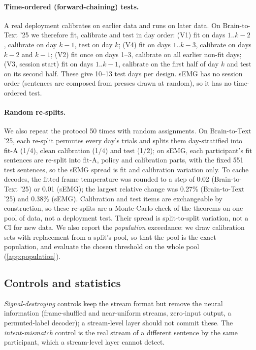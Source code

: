 \paragraph{Time-ordered (forward-chaining) tests.} A real deployment calibrates on earlier data and runs on later data. On Brain-to-Text '25 we therefore fit, calibrate and test in day order: (V1) fit on days $1..k{-}2$, calibrate on day $k{-}1$, test on day $k$; (V4) fit on days $1..k{-}3$, calibrate on days $k{-}2$ and $k{-}1$; (V2) fit once on days 1--3, calibrate on all earlier non-fit days; (V3, session start) fit on days $1..k{-}1$, calibrate on the first half of day $k$ and test on its second half. These give 10--13 test days per design. sEMG has no session order (sentences are composed from presses drawn at random), so it has no time-ordered test.

\paragraph{Random re-splits.} We also repeat the protocol 50 times with random assignments. On Brain-to-Text '25, each re-split permutes every day's trials and splits them day-stratified into fit-A (1/4), clean calibration (1/4) and test (1/2); on sEMG, each participant's fit sentences are re-split into fit-A, policy and calibration parts, with the fixed 551 test sentences, so the sEMG spread is fit and calibration variation only. To cache decodes, the fitted frame temperature was rounded to a step of 0.02 (Brain-to-Text '25) or 0.01 (sEMG); the largest relative change was 0.27\% (Brain-to-Text '25) and 0.38\% (sEMG). Calibration and test items are exchangeable by construction, so these re-splits are a Monte-Carlo check of the theorems on one pool of data, not a deployment test. Their spread is split-to-split variation, not a CI for new data. We also report the \emph{population} exceedance: we draw calibration sets with replacement from a split's pool, so that the pool is the exact population, and evaluate the chosen threshold on the whole pool (\cref{app:population}).

\subsection{Controls and statistics}
\emph{Signal-destroying} controls keep the stream format but remove the neural information (frame-shuffled and near-uniform streams, zero-input output, a permuted-label decoder); a stream-level layer should not commit these. The \emph{intent-mismatch} control is the real stream of a different sentence by the same participant, which a stream-level layer cannot detect.

